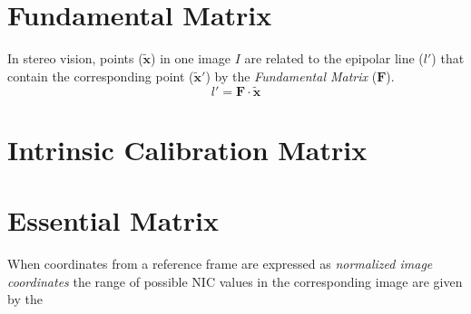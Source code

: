 \documentclass{report}
\begin{document}
\section{Fundamental Matrix}
In stereo vision, points ($\mathbf{\tilde{x}}$) in one image $I$ are related to the epipolar line ($l'$) that contain the corresponding point ($\mathbf{\tilde{x}}'$) by the \textit{Fundamental Matrix} ($\mathbf{F}$).
\begin{equation*}
l'=\mathbf{F}\cdot\mathbf{\tilde{x}}
\end{equation*}

\section{Intrinsic Calibration Matrix}

\section{Essential Matrix}
\par When coordinates from a reference frame are expressed as \textit{normalized image coordinates} the range of possible NIC values in the corresponding image are given by the 

\end{document}

